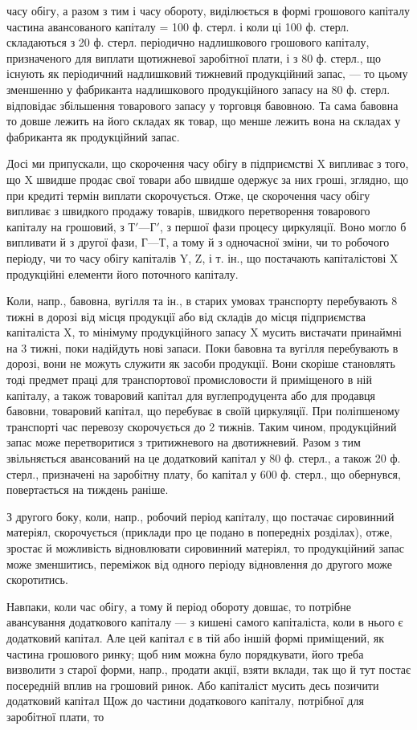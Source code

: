 \parcont{}  %
часу обігу, а разом з тим і часу обороту, виділюється в формі грошового
капіталу  частина авансованого капіталу = 100 ф. стерл. і коли
ці 100 ф. стерл. складаються з 20 ф. стерл. періодично надлишкового
грошового капіталу, призначеного для виплати щотижневої заробітної
плати, і з 80 ф. стерл., що існують як періодичний надлишковий тижневий
продукційний запас, — то цьому зменшенню у фабриканта надлишкового
продукційного запасу на 80 ф. стерл. відповідає збільшення товарового
запасу у торговця бавовною. Та сама бавовна то довше лежить
на його складах як товар, що менше лежить вона на складах у фабриканта
як продукційний запас.

Досі ми припускали, що скорочення часу обігу в підприємстві X випливає
з того, що X швидше продає свої товари або швидше одержує
за них гроші, зглядно, що при кредиті термін виплати скорочується.
Отже, це скорочення часу обігу випливає з швидкого продажу товарів,
швидкого перетворення товарового капіталу на грошовий, з $Т' — Г'$, з
першої фази процесу циркуляції. Воно могло б випливати й з другої фази,
$Г — Т$, а тому й з одночасної зміни, чи то робочого періоду, чи то часу
обігу капіталів Y, Z, і т. ін., що постачають капіталістові X продукційні
елементи його поточного капіталу.

Коли, напр., бавовна, вугілля та ін., в старих умовах транспорту перебувають
8 тижні в дорозі від місця продукції або від складів до місця
підприємства капіталіста X, то мінімуму продукційного запасу X мусить
вистачати принаймні на 3 тижні, поки надійдуть нові запаси. Поки
бавовна та вугілля перебувають в дорозі, вони не можуть служити як
засоби продукції. Вони скоріше становлять тоді предмет праці для транспортової
промисловости й приміщеного в ній капіталу, а також товаровий
капітал для вуглепродуцента або для продавця бавовни, товаровий капітал,
що перебуває в своїй циркуляції. При поліпшеному транспорті час
перевозу скорочується до 2 тижнів. Таким чином, продукційний запас може
перетворитися з тритижневого на двотижневий. Разом з тим звільняється
авансований на це додатковий капітал у 80 ф. стерл., а також 20
ф. стерл., призначені на заробітну плату, бо капітал у 600 ф. стерл.,
що обернувся, повертається на тиждень раніше.

З другого боку, коли, напр., робочий період капіталу, що постачає
сировинний матеріял, скорочується (приклади про це подано в попередніх
розділах), отже, зростає й можливість відновлювати сировинний матеріял,
то продукційний запас може зменшитись, переміжок від одного періоду
відновлення до другого може скоротитись.

Навпаки, коли час обігу, а тому й період обороту довшає, то потрібне
авансування додаткового капіталу — з кишені самого капіталіста,
коли в нього є додатковий капітал. Але цей капітал є в тій
або іншій формі приміщений, як частина грошового ринку; щоб ним
можна було порядкувати, його треба визволити з старої форми, напр.,
продати акції, взяти вклади, так що й тут постає посередній вплив на
грошовий ринок. Або капіталіст мусить десь позичити додатковий капітал
Щож до частини додаткового капіталу, потрібної для заробітної плати, то
\parbreak{}  %
